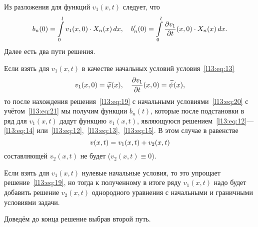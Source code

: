 Из разложения для функций $v_1(x,t)$ следует, что
\begin{equation}\label{l13:eq:20}
	\hfill b_n(0)=\int\limits_0^l v_1(x,0)\cdot X_n(x)\,dx,\quad b'_n(0)=\int\limits_0^l \pder{v_1}{t}(x,0)\cdot X_n(x)\,dx.\hfill
\end{equation}
Далее есть два пути решения.
\begin{enumerateD}
	\item Если взять для $v_1(x,t)$ в качестве начальных условий условия~\eqref{l13:eq:13}
	\begin{equation}\label{l13:eq:21}
		\hfill v_1(x,0)=\widetilde{\phi}(x),\quad\pder{v_1}{t}(x,0)=\widetilde{\psi}(x),\hfill
	\end{equation}
	то после нахождения решения~\eqref{l13:eq:19} с начальными условиями~\eqref{l13:eq:20} с учётом~\eqref{l13:eq:21} мы получим функции $b_n(t)$, которые после подстановки в ряд для $v_1(x,t)$ дадут функцию $v_1(x,t)$, являющуюся решением~\eqref{l13:eq:12}---\eqref{l13:eq:14} или~\eqref{l13:eq:12},~\eqref{l13:eq:13},~\eqref{l13:eq:15}. В этом случае в равенстве 
	\begin{equation*}
		\hfill v(x,t)=v_1(x,t)+v_2(x,t)\hfill
	\end{equation*} 
	составляющей $v_2(x,t)$ не будет ($v_2(x,t)\equiv0$).
	\item Если взять для $v_1(x,t)$ нулевые начальные условия, то это упрощает решение~\eqref{l13:eq:19}, но тогда к полученному в итоге ряду $v_1(x,t)$ надо будет добавить решение $v_2(x,t)$ однородного уравнения с начальными и граничными условиями задачи.   
\end{enumerateD}

\noindent Доведём до конца решение выбрав второй путь.  

